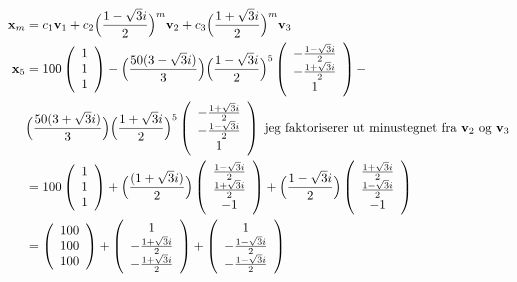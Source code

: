 \documentclass[a4paper,12pt,norsk]{article}
\begin{document}
\begin{align*}
\bold{x}_m &= c_1\bold{v}_1 + c_2\Big(\frac{1-\sqrt{3}i}{2}\Big)^m\bold{v}_2 + c_3\Big(\frac{1+\sqrt{3}i}{2}\Big)^m\bold{v}_3\\
\bold{x}_5 &= 
100 \left({\begin{array}{cc} 1\\ 1\\ 1  \end{array}}\right) -
\Big(\frac{50(3-\sqrt{3}i)}{3}\Big)\Big(\frac{1-\sqrt{3}i}{2}\Big)^5\left({\begin{array}{cc} -\frac{1-\sqrt{3}i}{2}\\ -\frac{1+\sqrt{3}i}{2}\\ 1  \end{array}}\right) -\\
&\Big(\frac{50(3+\sqrt{3}i)}{3}\Big)\Big(\frac{1+\sqrt{3}i}{2}\Big)^5\left({\begin{array}{cc} -\frac{1+\sqrt{3}i}{2}\\ -\frac{1-\sqrt{3}i}{2}\\ 1  \end{array}}\right)\text{ jeg faktoriserer ut minustegnet fra $\bold{v}_2$ og $\bold{v}_3$} \\ 
&= 100 \left({\begin{array}{cc} 1\\ 1\\ 1  \end{array}}\right) + \Big(\frac{(1+\sqrt{3}i)}{2}\Big) \left({\begin{array}{cc} \frac{1-\sqrt{3}i}{2}\\ \frac{1+\sqrt{3}i}{2}\\ -1  \end{array}}\right) + 
\Big(\frac{1-\sqrt{3}i}{2}\Big)\left({\begin{array}{cc} \frac{1+\sqrt{3}i}{2}\\ \frac{1-\sqrt{3}i}{2}\\ -1  \end{array}}\right)\\
&= \left({\begin{array}{cc} 100\\ 100\\ 100  \end{array}}\right) +\left({\begin{array}{cc} 1 \\ -\frac{1+\sqrt{3}i}{2}\\ -\frac{1+\sqrt{3}i}{2}  \end{array}}\right) + \left({\begin{array}{cc} 1 \\ -\frac{1-\sqrt{3}i}{2}\\ -\frac{1-\sqrt{3}i}{2}  \end{array}}\right)
\end{align*}
\end{document}
